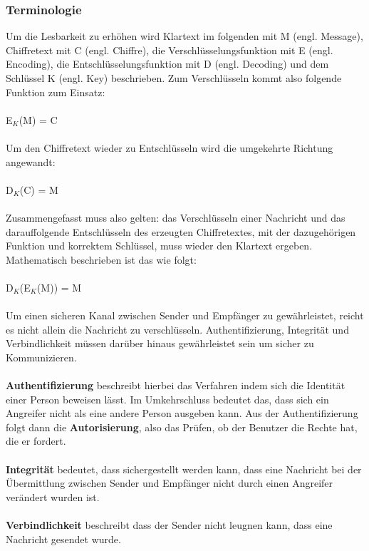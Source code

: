 \documentclass[10pt, a4paper]{scrreprt}
\begin{document}
\subsubsection{Terminologie}
Um die Lesbarkeit zu erhöhen wird Klartext im folgenden mit M (engl. Message), Chiffretext mit C (engl. Chiffre), die Verschlüsselungsfunktion mit E (engl. Encoding), die Entschlüsselungsfunktion mit D (engl. Decoding) und dem Schlüssel K (engl. Key) beschrieben.
Zum Verschlüsseln kommt also folgende Funktion zum Einsatz: \\ \\
E$_{K}$(M) = C\\ \\ 
Um den Chiffretext wieder zu Entschlüsseln wird die umgekehrte Richtung angewandt:\\ \\
D$_{K}$(C) = M\\ \\
Zusammengefasst muss also gelten: das Verschlüsseln einer Nachricht und das darauffolgende Entschlüsseln des erzeugten Chiffretextes, mit der dazugehörigen Funktion und korrektem Schlüssel, muss wieder den Klartext ergeben. Mathematisch beschrieben ist das wie folgt:\\ \\
D$_{K}$(E$_{K}$(M)) = M\\ \\
Um einen sicheren Kanal zwischen Sender und Empfänger zu gewährleistet, reicht es nicht allein die Nachricht zu verschlüsseln. Authentifizierung, Integrität und Verbindlichkeit müssen darüber hinaus gewährleistet sein um sicher zu Kommunizieren. \\ \\
\textbf{Authentifizierung} beschreibt hierbei das Verfahren indem sich die Identität einer Person beweisen lässt. Im Umkehrschluss bedeutet das, dass sich ein Angreifer nicht als eine andere Person ausgeben kann. Aus der Authentifizierung folgt dann die \textbf{Autorisierung}, also das Prüfen, ob der Benutzer die Rechte hat, die er fordert.\\ \\
\textbf{Integrität} bedeutet, dass sichergestellt werden kann, dass eine Nachricht bei der Übermittlung zwischen Sender und Empfänger nicht durch einen Angreifer verändert wurden ist. \\ \\
\textbf{Verbindlichkeit} beschreibt  dass der Sender nicht leugnen kann, dass eine Nachricht gesendet wurde. \\ \\
\end{document}
